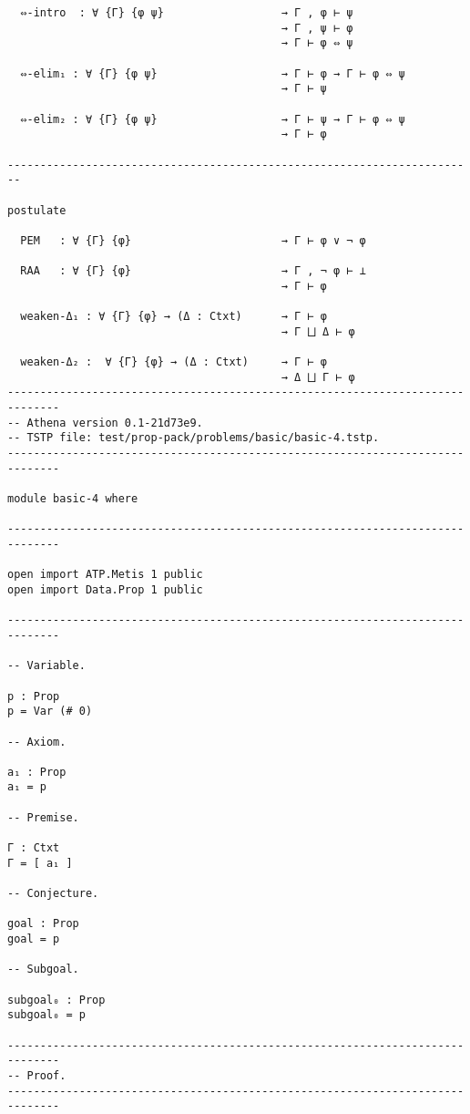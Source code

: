 \documentclass{article}
\begin{document}
\begin{listing}[ht]
\begin{verbatim}
  ⇔-intro  : ∀ {Γ} {φ ψ}                  → Γ , φ ⊢ ψ
                                          → Γ , ψ ⊢ φ
                                          → Γ ⊢ φ ⇔ ψ

  ⇔-elim₁ : ∀ {Γ} {φ ψ}                   → Γ ⊢ φ → Γ ⊢ φ ⇔ ψ
                                          → Γ ⊢ ψ

  ⇔-elim₂ : ∀ {Γ} {φ ψ}                   → Γ ⊢ ψ → Γ ⊢ φ ⇔ ψ
                                          → Γ ⊢ φ

------------------------------------------------------------------------

postulate

  PEM   : ∀ {Γ} {φ}                       → Γ ⊢ φ ∨ ¬ φ

  RAA   : ∀ {Γ} {φ}                       → Γ , ¬ φ ⊢ ⊥
                                          → Γ ⊢ φ

  weaken-Δ₁ : ∀ {Γ} {φ} → (Δ : Ctxt)      → Γ ⊢ φ
                                          → Γ ⨆ Δ ⊢ φ

  weaken-Δ₂ :  ∀ {Γ} {φ} → (Δ : Ctxt)     → Γ ⊢ φ
                                          → Δ ⨆ Γ ⊢ φ
------------------------------------------------------------------------------
-- Athena version 0.1-21d73e9.
-- TSTP file: test/prop-pack/problems/basic/basic-4.tstp.
------------------------------------------------------------------------------

module basic-4 where

------------------------------------------------------------------------------

open import ATP.Metis 1 public
open import Data.Prop 1 public

------------------------------------------------------------------------------

-- Variable.

p : Prop
p = Var (# 0)

-- Axiom.

a₁ : Prop
a₁ = p

-- Premise.

Γ : Ctxt
Γ = [ a₁ ]

-- Conjecture.

goal : Prop
goal = p

-- Subgoal.

subgoal₀ : Prop
subgoal₀ = p

------------------------------------------------------------------------------
-- Proof.
------------------------------------------------------------------------------


\end{verbatim}
\end{listing}
\end{document}
